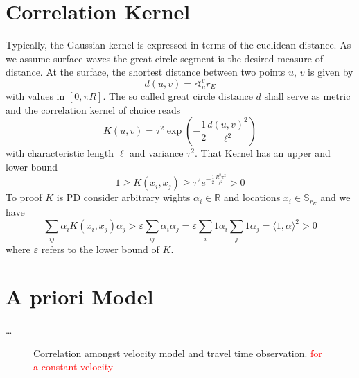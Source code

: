 \documentclass[11pt]{article}
\newcommand\worries[1]{\textcolor{red}{#1}}
\begin{document}
\section{Correlation Kernel}

Typically, the Gaussian kernel is expressed in terms of the euclidean distance.
As we assume surface waves the great circle segment is the desired measure of distance.
At the surface, the shortest distance between two points $u$, $v$ is given by
\begin{equation}
    d(u,v) = \sphericalangle_u^v r_E
\end{equation}
with values in $[0, \pi R]$.
The so called great circle distance $d$ shall serve as metric and the correlation kernel of choice reads
\begin{equation}
    K(u,v) = \tau^2 \exp\!\left(-\frac 12 \frac{d(u,v)^2}{\ell^2}\right)
\end{equation}
with characteristic length $\ell$ and variance $\tau^2$.
That Kernel has an upper and lower bound
\begin{equation}
    1 \geq K(x_i,x_j) \geq \tau^2 e^{-\frac12\frac{R^2\pi^2}{\ell^2}} > 0
\end{equation}
To proof $K$ is PD consider arbitrary wights $\alpha_i \in \mathbb R$ and locations $x_i \in \mathbb S_{r_E}$ and we have
\begin{equation}
    \sum_{ij} \alpha_i K(x_i, x_j) \alpha_j >
    \varepsilon \sum_{ij} \alpha_i \alpha_j =
    \varepsilon \sum_i 1 \alpha_i \sum_j 1 \alpha_j =
    \langle 1,\alpha \rangle^2 > 0
\end{equation}
where $\varepsilon$ refers to the lower bound of $K$.


\section{A priori Model}
\dots

\begin{figure}
    \centering
    
    \caption{Correlation amongst velocity model and travel time observation.
            \worries{for a constant velocity} }
    \label{fig:correlation}
\end{figure}
\end{document}
